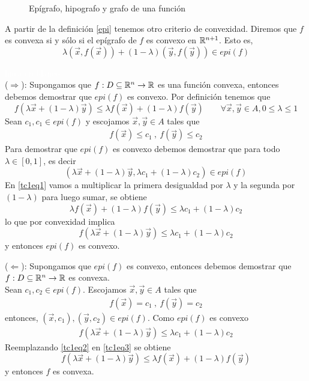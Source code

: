 \begin{figure}[H]
	\centering
	
	\caption{Ep\'igrafo, hipografo y grafo de una funci\'on}
\end{figure}

\begin{teorema}\label{teoconvexidad1}
A partir de la definici\'on \ref{epi} tenemos otro criterio de convexidad. Diremos que $f$ es convexa si y s\'olo si el ep\'igrafo de $f$ es convexo en $\mathbb{R}^{n+1}$. Esto es,
$$\lambda (\vec{x},f(\vec{x})) + (1-\lambda)(\vec{y},f(\vec{y}))\in epi(f)$$
\end{teorema}

\begin{demostracion}\textcolor{white}{linea en blanco}
\\($\Rightarrow$): Supongamos que $f:D\subseteq \mathbb{R}^n \to \mathbb{R}$ es una funci\'on convexa, entonces debemos demostrar que $epi(f)$ es convexo. Por definici\'on tenemos que
$$
f(\lambda \vec{x} + (1-\lambda) \vec{y}) \leq \lambda f(\vec{x}) + (1-\lambda) f(\vec{y}) \qquad \forall \vec{x},\vec{y} \in A , 0\leq \lambda \leq 1 
$$
Sean $c_1 , c_1 \in epi(f)$ y escojamos $\vec{x},\vec{y}\in A$ tales que 
\begin{gather}\label{tc1eq1}
f(\vec{x})\leq c_1 \:,\: f(\vec{y})\leq c_2 \tag{*}
\end{gather}
Para demostrar que $epi(f)$ es convexo debemos demostrar que para todo $\lambda \in [0,1]$, es decir 
$$(\lambda \vec{x} + (1-\lambda)\vec{y} , \lambda c_1 + (1-\lambda)c_2)\in epi(f)$$
En \eqref{tc1eq1} vamos a multiplicar la primera desigualdad por $\lambda$ y la segunda por $(1-\lambda)$ para luego sumar, se obtiene
$$\lambda f(\vec{x}) + (1-\lambda)f(\vec{y}) \leq \lambda c_1 + (1-\lambda)c_2$$
lo que por convexidad implica
$$f(\lambda \vec{x} + (1-\lambda)\vec{y}) \leq \lambda c_1 + (1-\lambda)c_2$$
y entonces $epi(f)$ es convexo.

\medskip

($\Leftarrow$): Supongamos que $epi(f)$ es convexo, entonces debemos demostrar que $f: D\subseteq \mathbb{R}^n \to \mathbb{R}$ es convexa.
\\Sean $c_1,c_2 \in epi(f)$. Escojamos $\vec{x},\vec{y} \in A$ tales que 
\begin{gather}\label{tc1eq2}
f(\vec{x})=c_1 \:,\: f(\vec{y})=c_2 \tag{*}
\end{gather}
entonces, $(\vec{x},c_1),(\vec{y},c_2)\in epi(f)$. Como $epi(f)$ es convexo
\begin{gather}\label{tc1eq3}
f(\lambda \vec{x} + (1-\lambda)\vec{y})\leq \lambda c_1 + (1-\lambda)c_2 \tag{**}
\end{gather}
Reemplazando \eqref{tc1eq2} en \eqref{tc1eq3} se obtiene
$$f(\lambda \vec{x} + (1-\lambda)\vec{y})\leq \lambda f(\vec{x}) + (1-\lambda) f(\vec{y})$$
y entonces $f$ es convexa.
\end{demostracion}


